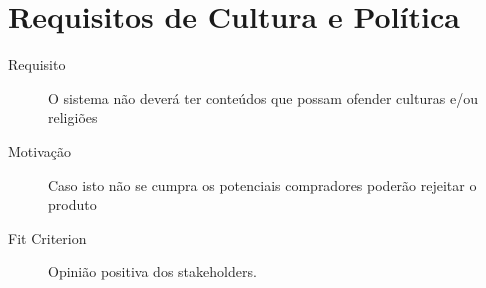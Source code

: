 

\section{Requisitos de Cultura e Política}
\begin{description}
\item[Requisito] O sistema não deverá ter conteúdos que possam ofender culturas e/ou religiões 
\item[Motivação] Caso isto não se cumpra os potenciais compradores poderão rejeitar o produto
\item[Fit Criterion] Opinião positiva dos stakeholders.
\end{description}

